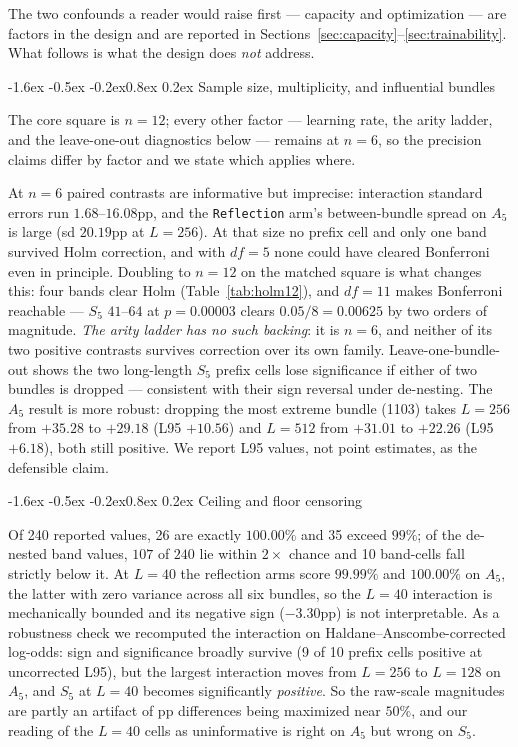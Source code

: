 \documentclass[10pt,twocolumn]{article}
\makeatletter
\renewcommand\subsection{\@startsection{subsection}{2}{\z@}%
  {-1.6ex \@plus -0.5ex \@minus -0.2ex}{0.8ex \@plus 0.2ex}%
  {\normalfont\normalsize\bfseries}}
\makeatother
\begin{document}
The two confounds a reader would raise first --- capacity and optimization ---
are factors in the design and are reported in
Sections~\ref{sec:capacity}--\ref{sec:trainability}. What follows is what the
design does \emph{not} address.

\subsection{Sample size, multiplicity, and influential bundles}

The core square is $n=12$; every other factor --- learning rate, the arity
ladder, and the leave-one-out diagnostics below --- remains at $n=6$, so the
precision claims differ by factor and we state which applies where.

At $n=6$ paired contrasts are informative but imprecise: interaction
standard errors run $1.68$--$16.08$pp, and the \texttt{Reflection} arm's
between-bundle spread on $A_5$ is large (sd $20.19$pp at $L=256$). At that size
no prefix cell and only one band survived Holm correction, and with $df=5$ none
could have cleared Bonferroni even in principle. Doubling to $n=12$ on the
matched square is what changes this: four bands clear Holm
(Table~\ref{tab:holm12}), and $df=11$ makes Bonferroni reachable --- $S_5$
$41$--$64$ at $p=0.00003$ clears $0.05/8=0.00625$ by two orders of magnitude.
\emph{The arity ladder has no such backing}: it is $n=6$, and neither of its two
positive contrasts survives correction over its own family. Leave-one-bundle-out shows the two long-length $S_5$ prefix cells
lose significance if either of two bundles is dropped --- consistent with their
sign reversal under de-nesting. The $A_5$ result is more robust: dropping the
most extreme bundle (1103) takes $L=256$ from $+35.28$ to $+29.18$
(L95 $+10.56$) and $L=512$ from $+31.01$ to $+22.26$ (L95 $+6.18$), both still
positive. We report L95 values, not point estimates, as the defensible claim.

\subsection{Ceiling and floor censoring}

Of 240 reported values, 26 are exactly $100.00\%$ and 35 exceed $99\%$; of the
de-nested band values, $107$ of $240$ lie within $2\times$ chance and 10
band-cells fall strictly below it. At $L=40$ the reflection arms score $99.99\%$
and $100.00\%$ on $A_5$, the latter with zero variance across all six bundles,
so the $L=40$ interaction is mechanically bounded and its negative sign
($-3.30$pp) is not interpretable. As a robustness check we recomputed the
interaction on Haldane--Anscombe-corrected log-odds: sign and significance
broadly survive (9 of 10 prefix cells positive at uncorrected L95), but the
largest interaction moves from $L=256$ to $L=128$ on $A_5$, and $S_5$ at $L=40$
becomes significantly \emph{positive}. So the raw-scale magnitudes are partly an
artifact of pp differences being maximized near $50\%$, and our reading of the
$L=40$ cells as uninformative is right on $A_5$ but wrong on $S_5$.
\end{document}
